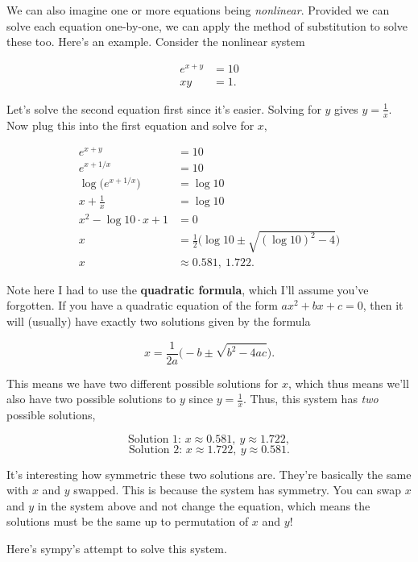 \documentclass[
  letterpaper,
  DIV=11,
  numbers=noendperiod]{scrreprt}
\begin{document}
We can also imagine one or more equations being \emph{nonlinear}.
Provided we can solve each equation one-by-one, we can apply the method
of substitution to solve these too. Here's an example. Consider the
nonlinear system

\begin{align*}
e^{x + y} &= 10  \\
xy &= 1.
\end{align*}

Let's solve the second equation first since it's easier. Solving for
\(y\) gives \(y = \frac{1}{x}\). Now plug this into the first equation
and solve for \(x\),

\begin{align*}
e^{x + y} &= 10  \\
e^{x + 1/x} &= 10  \\
\log \big(e^{x + 1/x}\big) &= \log 10 \\
x + \frac{1}{x} &= \log 10 \\
x^2 - \log 10 \cdot x + 1 &= 0 \\
x &= \frac{1}{2} \bigg(\log 10 \pm \sqrt{(\log 10)^2 - 4}\bigg) \\
x &\approx 0.581, \ 1.722.
\end{align*}

Note here I had to use the \textbf{quadratic formula}, which I'll assume
you've forgotten. If you have a quadratic equation of the form
\(ax^2 + bx + c = 0\), then it will (usually) have exactly two solutions
given by the formula

\[x = \frac{1}{2a} \bigg(-b \pm \sqrt{b^2 - 4ac}\bigg).\]

This means we have two different possible solutions for \(x\), which
thus means we'll also have two possible solutions to \(y\) since
\(y=\frac{1}{x}\). Thus, this system has \emph{two} possible solutions,

\[\text{Solution 1: }x \approx 0.581, \ y \approx 1.722,\]
\[\text{Solution 2: }x \approx 1.722, \ y \approx 0.581.\]

It's interesting how symmetric these two solutions are. They're
basically the same with \(x\) and \(y\) swapped. This is because the
system has symmetry. You can swap \(x\) and \(y\) in the system above
and not change the equation, which means the solutions must be the same
up to permutation of \(x\) and \(y\)!

Here's sympy's attempt to solve this system.
\end{document}
